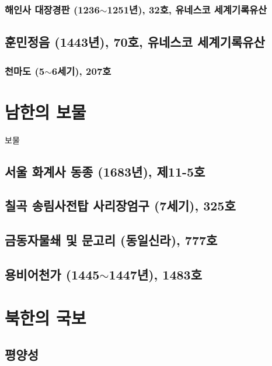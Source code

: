 \documentclass[a4paper,11pt]{book}
\begin{document}
\subsection{해인사 대장경판 (1236$\sim$1251년), 32호, 유네스코 세계기록유산}
\section{훈민정음 (1443년), 70호, 유네스코 세계기록유산}
\subsection{천마도 (5$\sim$6세기), 207호}
\chapter{남한의 보물}
보물\cite{k3}
\section{서울 화계사 동종 (1683년), 제11-5호}
\section{칠곡 송림사전탑 사리장엄구 (7세기), 325호}
\section{금동자물쇄 및 문고리 (동일신라), 777호}
\section{용비어천가 (1445$\sim$1447년), 1483호}
\chapter{북한의 국보}
\section{ 평양성}
\end{document}
